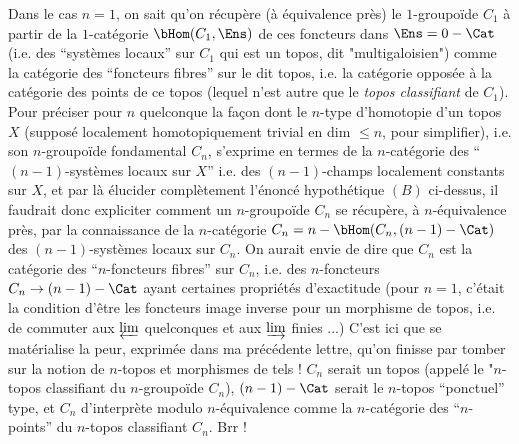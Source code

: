Dans le cas $n = 1$, on sait qu'on récupère (à équivalence près) le $1$-groupoïde $C_1$ à partir de la $1$-catégorie $\bHom(C_1, \Ens)$ de ces foncteurs dans $\Ens = 0-\Cat$ (i.e. des ``systèmes locaux'' sur $C_1$ qui est un topos, dit "multigaloisien") comme la catégorie des ``foncteurs fibres'' sur le dit topos, i.e. la catégorie opposée à la catégorie des points de ce topos (lequel n’est autre que le \emph{topos classifiant} de $C_1$). Pour préciser pour $n$ quelconque la façon dont le $n$-type d’homotopie d’un topos $X$ (supposé localement homotopiquement trivial en dim $\leq n$, pour simplifier), i.e. son $n$-groupoïde fondamental $C_n$, s’exprime en termes de la $n$-catégorie des ``$(n-1)$-systèmes locaux sur $X$'' i.e. des $(n-1)$-champs localement constants sur $X$, et par là élucider complètement l’énoncé hypothétique $(B)$ ci-dessus, il faudrait donc expliciter comment un $n$-groupoïde $C_n$ se récupère, à $n$-équivalence près, par la connaissance de la $n$-catégorie $C_n = n-\bHom (C_n, (n-1)-\Cat)$ des $(n-1)$-systèmes locaux sur $C_n$. On aurait envie de dire que $C_n$ est la catégorie des ``$n$-foncteurs fibres'' sur $C_n$, i.e. des $n$-foncteurs $C_n \to (n-1)-\Cat$ ayant certaines propriétés d’exactitude (pour $n = 1$, c’était la condition d’être les foncteurs image inverse pour un morphisme de topos, i.e. de commuter aux $\varprojlim$ quelconques et aux $\varinjlim$ finies ...)  C’est ici que se matérialise la peur, exprimée dans ma précédente lettre, qu’on finisse par tomber sur la notion de $n$-topos et morphismes de tels ! $C_n$ serait un topos (appelé le "$n$-topos classifiant du $n$-groupoïde $C_n$), $(n-1)-\Cat$ serait le $n$-topos ``ponctuel'' type, et $C_n$ d’interprète modulo $n$-équivalence comme la $n$-catégorie des ``$n$-points'' du $n$-topos classifiant $C_n$. Brr !

